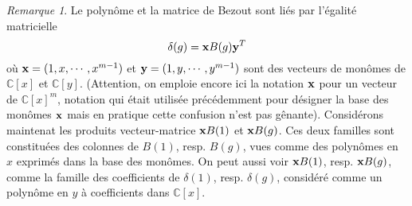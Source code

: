 \documentclass{article}
\theoremstyle{plain}%
\theoremstyle{definition}
\theoremstyle{remark}
\newtheorem*{rem}{Remarque}
\newcommand{\C}{\mathbb{C}}
\begin{document}
\begin{rem}
Le polynôme et la matrice de Bezout sont liés par l'égalité matricielle
\begin{equation}
	\delta(g) = \bold{x} B(g) \bold{y}^T
\end{equation}
où $\bold{x} = (1, x,\cdots, x^{m-1})$ et $\bold{y} = (1, y,\cdots, y^{m-1})$ sont des vecteurs de monômes de $\C[x]$ et $\C[y]$. (Attention, on emploie encore ici la notation ${\bold x}$ pour un vecteur de $\C[x]^m$, notation qui était utilisée précédemment pour désigner la base des monômes ${\bold x}$ mais en pratique cette confusion n'est pas gênante).
Considérons maintenat les produits vecteur-matrice $\bold{x}B(1)$ et $\bold{x}B(g)$. Ces deux familles sont constituées des colonnes de $B(1)$, resp. $B(g)$, vues comme des polynômes en $x$ exprimés dans la base des monômes. On peut aussi voir $\bold{x}B(1)$, resp. $\bold{x}B(g)$, comme la famille des coefficients de $\delta(1)$, resp. $\delta(g)$, considéré comme un polynôme en $y$ à coefficients dans $\C[x]$.
\end{rem}
\end{document}
